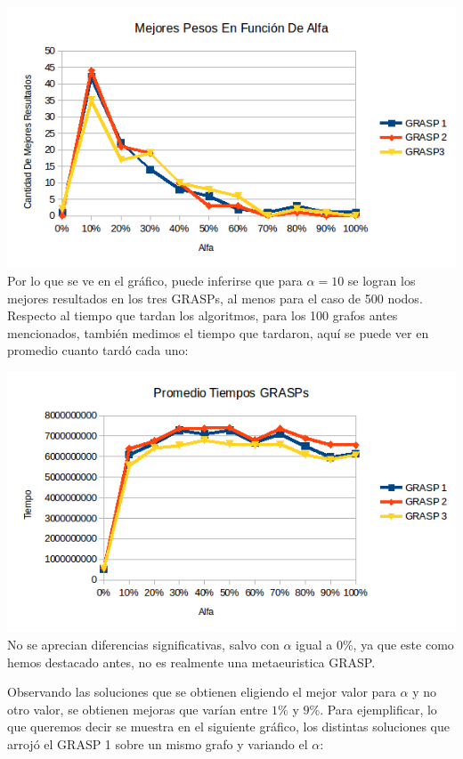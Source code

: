 \includegraphics[scale=0.7]{Ej5/respuestasAlfa1.png}\\

Por lo que se ve en el gráfico, puede inferirse que para $\alpha=10$ se logran los mejores resultados en los tres GRASPs, al menos para el caso de 500 nodos. Respecto al tiempo que tardan los algoritmos, para los 100 grafos antes mencionados, también medimos el tiempo que tardaron, aquí se puede ver en promedio cuanto tardó cada uno:

\includegraphics[scale=0.7]{Ej5/tiemposAlfa.png}\\

No se aprecian diferencias significativas, salvo con $\alpha$ igual a $0 \%$, ya que este como hemos destacado antes, no es realmente una metaeuristica GRASP.

Observando las soluciones que se obtienen eligiendo el mejor valor para $\alpha$ y no otro valor, se obtienen mejoras que varían entre $1\%$ y $9\%$. Para ejemplificar, lo que queremos decir se muestra en el siguiente gráfico, los distintas soluciones que arrojó el GRASP 1 sobre un mismo grafo y variando el $\alpha$:

